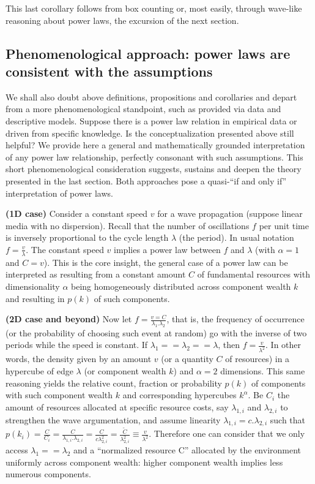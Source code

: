 \documentclass[a4paper, 11pt]{article} %
\begin{document}
This last corollary follows from box counting or, most easily,
through wave-like reasoning about power laws,
the excursion of the next section.

\subsection{Phenomenological approach: power laws are consistent with the assumptions}\label{sec:phen}

We shall also
doubt above definitions, propositions and corollaries 
and depart from a more phenomenological standpoint,
such as provided via data and descriptive models.
Suppose there is a power law relation in empirical data
or driven from specific knowledge.
Is the conceptualization
presented above still helpful?
We provide here a general and mathematically grounded
interpretation of any power law relationship,
perfectly consonant with such assumptions.
This short phenomenological consideration
suggests, sustains and deepen the theory presented in the last section.
Both approaches pose a quasi-``if and only if''
interpretation of power laws.

{\bf (1D case)} Consider a constant speed $v$ for a wave propagation
(suppose linear media with no dispersion).
Recall that the number of oscillations $f$ per unit time is
inversely proportional to the cycle length $\lambda$ (the period).
In usual notation $f=\frac{v}{\lambda}$.
The constant speed $v$ implies a power law between 
$f$ and $\lambda$ (with $\alpha=1$ and $C=v$).
This is the core insight, the general case of a power law can
be interpreted as resulting from a constant amount $C$ of
fundamental resources with dimensionality $\alpha$ 
being homogeneously distributed across
component wealth $k$ and 
resulting in $p(k)$ of such components.

{\bf (2D case and beyond)} Now let $f=\frac{v=C}{\lambda_1 . \lambda_2}$, that is,
the frequency of occurrence
(or the probability of choosing such event at random) go with the inverse of two periods while the speed is constant. 
If $\lambda_1==\lambda_2==\lambda$, then $f=\frac{v}{\lambda^2}$.
In other words, the density given by an amount $v$
(or a quantity $C$ of resources) in a hypercube of
edge $\lambda$ (or component wealth $k$)
and $\alpha=2$ dimensions.
This same reasoning yields the relative count,
fraction or probability $p(k)$
of components with such component wealth $k$ and corresponding hypercubes $k^\alpha$.
Be $C_i$ the amount of resources allocated at
specific resource costs,
say $\lambda_{1,i}$ and $\lambda_{2,i}$ to strengthen the wave argumentation,
and assume linearity $\lambda_{1,i}=c.\lambda_{2,i}$
such that
$p(k_i)=\frac{C}{C_i}=\frac{C}{\lambda_{1,i}.\lambda_{2,i}}=
\frac{C}{c\lambda_{2,i}^2}=\frac{\widetilde{C}}{\lambda_{2,i}^2}\equiv\frac{v}{\lambda^2}$.
Therefore one can consider that we only access $\lambda_1==\lambda_2$ and a ``normalized resource C'' allocated by the environment uniformly across component wealth:
higher component wealth implies less numerous components. 
\end{document}
